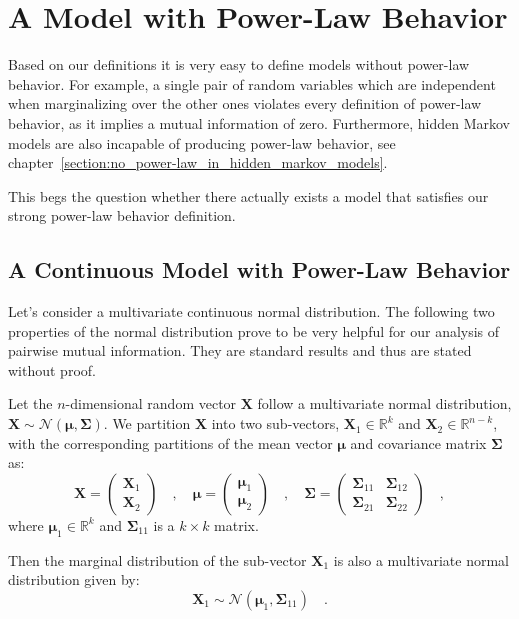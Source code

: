 \documentclass[../../main.tex]{subfiles}
\begin{document}
\section{A Model with Power-Law Behavior}
Based on our definitions it is very easy to define models without power-law behavior. For example, a single pair of random variables which are independent when marginalizing over the other ones violates every definition of power-law behavior, as it implies a mutual information of zero. Furthermore, hidden Markov models are also incapable of producing power-law behavior, see chapter~\ref{section:no_power-law_in_hidden_markov_models}.

This begs the question whether there actually exists a model that satisfies our strong power-law behavior definition.

\subsection{A Continuous Model with Power-Law Behavior}
Let's consider a multivariate continuous normal distribution. The following two properties of the normal distribution prove to be very helpful for our analysis of pairwise mutual information. They are standard results and thus are stated without proof.

\begin{proposition}
    \label{proposition:marginal_distributions_of_a_normal_distribution}
    Let the $n$-dimensional random vector $\bm{X}$ follow a multivariate normal distribution, $\bm{X} \sim \mathcal{N}(\bm{\mu}, \bm{\Sigma})$. We partition $\bm{X}$ into two sub-vectors, $\bm{X}_1 \in \mathbb{R}^k$ and $\bm{X}_2 \in \mathbb{R}^{n-k}$, with the corresponding partitions of the mean vector $\bm{\mu}$ and covariance matrix $\bm{\Sigma}$ as:
    \[
        \bm{X} = \begin{pmatrix} \bm{X}_1 \\ \bm{X}_2 \end{pmatrix} \quad , \quad 
        \bm{\mu} = \begin{pmatrix} \bm{\mu}_1 \\ \bm{\mu}_2 \end{pmatrix} \quad , \quad 
        \bm{\Sigma} = \begin{pmatrix} \bm{\Sigma}_{11} & \bm{\Sigma}_{12} \\ \bm{\Sigma}_{21} & \bm{\Sigma}_{22} \end{pmatrix} \quad ,
    \]
    where $\bm{\mu}_1 \in \mathbb{R}^k$ and $\bm{\Sigma}_{11}$ is a $k \times k$ matrix.
    
    Then the marginal distribution of the sub-vector $\bm{X}_1$ is also a multivariate normal distribution given by:
    \[
        \bm{X}_1 \sim \mathcal{N}(\bm{\mu}_1, \bm{\Sigma}_{11}) \quad .
    \]
\end{proposition}
\end{document}
